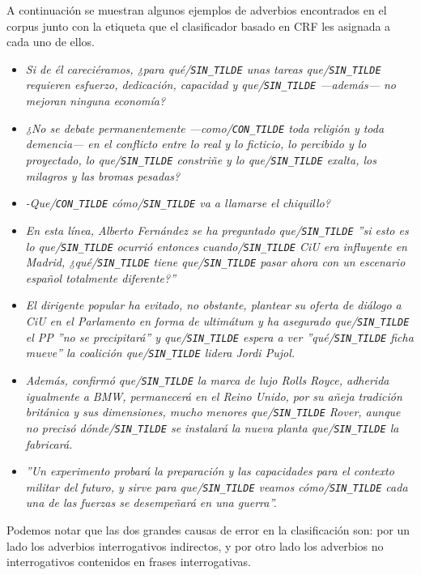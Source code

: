 \documentclass[runningheads,a4paper]{llncs}
\begin{document}
A continuación se muestran algunos ejemplos de adverbios encontrados en el corpus junto con la etiqueta que el clasificador basado en CRF les asignada a cada uno de ellos.
\begin{itemize}
\item{\emph{Si de él careciéramos, ¿para qu\'e/\texttt{\small SIN\_TILDE} unas tareas que/\texttt{\small SIN\_TILDE} requieren esfuerzo, dedicación, capacidad y que/\texttt{\small SIN\_TILDE} ---además--- no mejoran ninguna economía?}}

\item{\emph{¿No se debate permanentemente ---como/\texttt{\small CON\_TILDE} toda religión y toda de\-men\-cia--- en el conflicto entre lo real y lo ficticio, lo percibido y lo proyectado, lo que/\texttt{\small SIN\_TILDE} constriñe y lo que/\texttt{\small SIN\_TILDE} exalta, los milagros y las bromas pesadas?}}

\item{\emph{-Que/\texttt{\small CON\_TILDE} cómo/\texttt{\small SIN\_TILDE} va a llamarse el chiquillo?}}

\item{\emph{En esta línea, Alberto Fernández se ha preguntado que/\texttt{\small SIN\_TILDE} ''si esto es lo que/\texttt{\small SIN\_TILDE} ocurrió entonces cuando/\texttt{\small SIN\_TILDE} CiU era influyente en Madrid, ¿qu\'e/\texttt{\small SIN\_TILDE} tiene que/\texttt{\small SIN\_TILDE} pasar ahora con un escenario español totalmente diferente?''}}

\item{\emph{El dirigente popular ha evitado, no obstante, plantear su oferta de diálogo a CiU en el Parlamento en forma de ultimátum y ha asegurado que/\texttt{\small SIN\_TILDE} el PP ''no se precipitará'' y que/\texttt{\small SIN\_TILDE} espera a ver ''qué/\texttt{\small SIN\_TILDE} ficha mueve'' la coalición que/\texttt{\small SIN\_TILDE} lidera Jordi Pujol.}} 

\item{\emph{Además, confirmó que/\texttt{\small SIN\_TILDE} la marca de lujo Rolls Royce, adherida igualmente a BMW, permanecerá en el Reino Unido, por su añeja tradición británica y sus dimensiones, mucho menores que/\texttt{\small SIN\_TILDE} Rover, aunque no precisó d\'onde/\texttt{\small SIN\_TILDE} se instalará la nueva planta que/\texttt{\small SIN\_TILDE} la fabricará.}}

\item{\emph{''Un experimento probará la preparación y las capacidades para el contexto militar del futuro, y sirve para que/\texttt{\small SIN\_TILDE} veamos c\'omo/\texttt{\small SIN\_TILDE} cada una de las fuerzas se desempeñará en una guerra''. }}

\end{itemize}
Podemos notar que las dos grandes causas de error en la clasificación son: por un lado los adverbios interrogativos indirectos, y por otro lado los adverbios no interrogativos contenidos en frases interrogativas.
\end{document}
